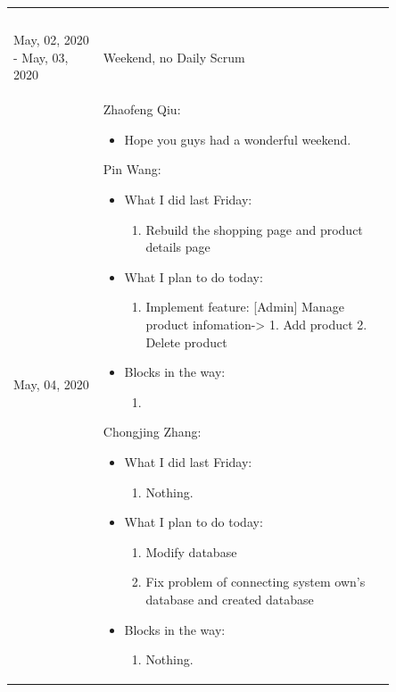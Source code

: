 \documentclass{report}
\begin{document}
\begin{tabularx}{0.95\linewidth}{%
  >{\raggedright\arraybackslash}p{0.2\linewidth}%
  >{\raggedright\arraybackslash}p{0.65\linewidth}}
\begin{itemize}
\begin{enumerate}
      \end{enumerate}
  \end{itemize}
  \\
  \\
  \midrule
  May, 02, 2020 - May, 03, 2020
  & Weekend, no Daily Scrum
  \\
  \midrule
  May, 04, 2020
  & 
  Zhaofeng Qiu:
  \begin{itemize}
    \item Hope you guys had a wonderful weekend.
  \end{itemize}
  Pin Wang:
  \begin{itemize}
    \item What I did last Friday: 
    \begin{enumerate}
      \item Rebuild the shopping page and product details page 
    \end{enumerate}
    \item What I plan to do today: 
    \begin{enumerate}
      \item Implement feature: [Admin] Manage product infomation-> 1. Add product 2. Delete product
    \end{enumerate}
    \item Blocks in the way: 
    \begin{enumerate}
      \item 
    \end{enumerate}
  \end{itemize}
  Chongjing Zhang:
  \begin{itemize}
    \item What I did last Friday: 
    \begin{enumerate}
      \item Nothing.
    \end{enumerate}
    \item What I plan to do today:
      \begin{enumerate}
        \item Modify database 
        \item Fix problem of connecting system own's database and created database
      \end{enumerate}
    \item Blocks in the way: 
      \begin{enumerate}
        \item Nothing.

\end{enumerate}
\end{itemize}
\end{tabularx}
\end{document}
